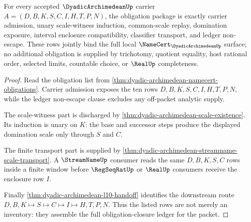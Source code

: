 \begin{theorem}
\label{thm:dyadic-archimedean-obligation-closure-ledger}
For every accepted $\DyadicArchimedeanUp$ carrier $A=(D,B,K,S,C,I,H,T,P,N)$, the obligation package is exactly carrier admission, unary scale-witness induction, common-scale replay, domination exposure, interval enclosure compatibility, classifier transport, and ledger non-escape. These rows jointly bind the full local $\NameCert_{\DyadicArchimedeanUp}$ surface; no additional obligation is supplied by trichotomy, quotient equality, host rational order, selected limits, countable choice, or $\RealUp$ completeness.
\end{theorem}
\begin{proof}
Read the obligation list from \autoref{thm:dyadic-archimedean-namecert-obligations}. Carrier admission exposes the ten rows $D,B,K,S,C,I,H,T,P,N$, while the ledger non-escape clause excludes any off-packet analytic supply.

The scale-witness part is discharged by \autoref{thm:dyadic-archimedean-scale-existence}. Its induction is unary on $K$: the base and successor steps produce the displayed domination scale only through $S$ and $C$.

The finite transport part is supplied by \autoref{thm:dyadic-archimedean-streamname-scale-transport}. A $\StreamNameUp$ consumer reads the same $D,B,K,S,C$ rows inside a finite window before $\RegSeqRatUp$ or $\RealUp$ consumers receive the enclosure row $I$.

Finally \autoref{thm:dyadic-archimedean-l10-handoff} identifies the downstream route $D,B,K \longmapsto S \longmapsto C \longmapsto I \longmapsto H,T,P,N$. Thus the listed rows are not merely an inventory: they assemble the full obligation-closure ledger for the packet.
\end{proof}



